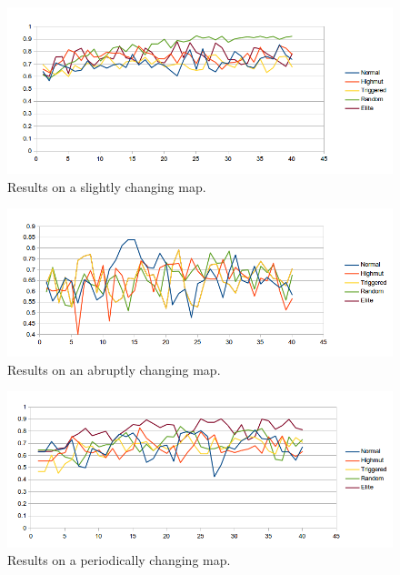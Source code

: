 \documentclass[a4paper,12pt]{article}
\begin{document}
\begin{figure}[]
\begin{center}

\includegraphics[width=\textwidth]{small.png}
 \caption[]   {Results on a slightly changing map.}
\label{fig:small}
\end{center}
\end{figure}

\begin{figure}[]
\begin{center}
\includegraphics[width=\textwidth]{big.png}
 \caption[]   {Results on an abruptly changing map.}
\label{fig:big}
\end{center}
\end{figure}

\begin{figure}[]
\begin{center}
\includegraphics[width=\textwidth]{periodic.png}
 \caption[]  {Results on a periodically changing map.}
\label{fig:periodic}
\end{center}
\end{figure}
\end{document}
